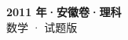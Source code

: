 \documentclass[zihao=-4, a4paper]{ctexart}
\begin{document}
\begin{center}
  {\Large\bfseries 2011 年·安徽卷·理科}\\[4pt]
  {\large 数学 · 试题版}
\end{center}
\medskip
{}

\end{document}
